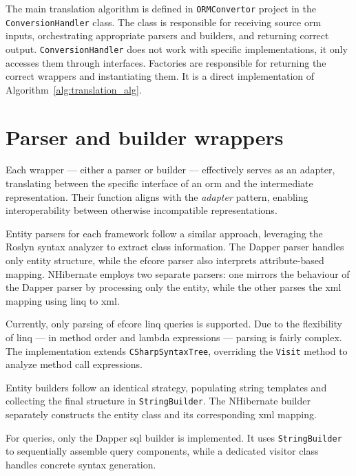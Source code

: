 The main translation algorithm is defined in \texttt{ORMConvertor} project in the \texttt{ConversionHandler} class. The class is responsible for receiving source \acrshort{orm} inputs, orchestrating appropriate parsers and builders, and returning correct output. \texttt{ConversionHandler} does not work with specific implementations, it only accesses them through interfaces. Factories are responsible for returning the correct wrappers and instantiating them. It is a direct implementation of Algorithm~\ref{alg:translation_alg}.

\section{Parser and builder wrappers}%
Each wrapper --- either a parser or builder --- effectively serves as an adapter, translating between the specific interface of an \acrshort{orm} and the intermediate representation. Their function aligns with the \textit{adapter} pattern, enabling interoperability between otherwise incompatible representations.

Entity parsers for each framework follow a similar approach, leveraging the Roslyn syntax analyzer to extract class information. The Dapper parser handles only entity structure, while the \acrshort{efcore} parser also interprets attribute-based mapping. NHibernate employs two separate parsers: one mirrors the behaviour of the Dapper parser by processing only the entity, while the other parses the \acrshort{xml} mapping using \acrshort{linq} to \acrshort{xml}.

Currently, only parsing of \acrshort{efcore} \acrshort{linq} queries is supported. Due to the flexibility of \acrshort{linq} --- in method order and lambda expressions --- parsing is fairly complex. The implementation extends \texttt{CSharpSyntaxTree}, overriding the \texttt{Visit} method to analyze method call expressions. 

Entity builders follow an identical strategy, populating string templates and collecting the final structure in \texttt{StringBuilder}. The NHibernate builder separately constructs the entity class and  its corresponding \acrshort{xml} mapping.

For queries, only the Dapper \acrshort{sql} builder is implemented. It uses \texttt{StringBuilder} to sequentially assemble query components, while a dedicated visitor class handles concrete syntax generation.


